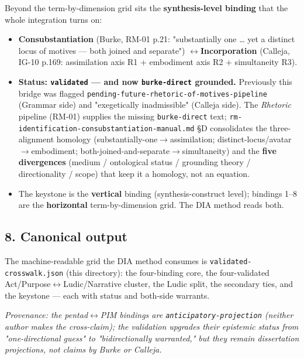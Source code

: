 \documentclass[11pt]{report}
\begin{document}
Beyond the term-by-dimension grid sits the \textbf{synthesis-level binding} that the whole integration turns on:


\begin{itemize}
\item \textbf{Consubstantiation} (Burke, RM-01 p.21: "substantially one … yet a distinct locus of motives — both joined and separate") $\leftrightarrow$\allowbreak  \textbf{Incorporation} (Calleja, IG-10 p.169: assimilation axis R1 + embodiment axis R2 + simultaneity R3).
\item \textbf{Status: \texttt{validated} — and now \texttt{burke-\discretionary{}{}{}direct} grounded.} Previously this bridge was flagged \texttt{pending-\discretionary{}{}{}future-\discretionary{}{}{}rhetoric-\discretionary{}{}{}of-\discretionary{}{}{}motives-\discretionary{}{}{}pipeline} (Grammar side) and "exegetically inadmissible" (Calleja side). The \textit{Rhetoric} pipeline (RM-01) supplies the missing \texttt{burke-\discretionary{}{}{}direct} text; \texttt{rm-\discretionary{}{}{}identification-\discretionary{}{}{}consubstantiation-\discretionary{}{}{}manual.\discretionary{}{}{}md} §D consolidates the three-alignment homology (substantially-one$\rightarrow$\allowbreak assimilation; distinct-locus/avatar$\rightarrow$\allowbreak embodiment; both-joined-and-separate$\rightarrow$\allowbreak simultaneity) and the \textbf{five divergences} (medium / ontological status / grounding theory / directionality / scope) that keep it a homology, not an equation.
\item The keystone is the \textbf{vertical} binding (synthesis-construct level); bindings 1–8 are the \textbf{horizontal} term-by-dimension grid. The DIA method reads both.
\end{itemize}


\subsection{8. Canonical output}


The machine-readable grid the DIA method consumes is \texttt{validated-\discretionary{}{}{}crosswalk.\discretionary{}{}{}json} (this directory): the four-binding core, the four-validated Act/Purpose$\leftrightarrow$\allowbreak Ludic/Narrative cluster, the Ludic split, the secondary ties, and the keystone — each with status and both-side warrants.


\textit{Provenance: the pentad$\leftrightarrow$\allowbreak PIM bindings are \texttt{anticipatory-\discretionary{}{}{}projection} (neither author makes the cross-claim); the validation upgrades their epistemic status from "one-directional guess" to "bidirectionally warranted," but they remain dissertation projections, not claims by Burke or Calleja.}
\end{document}
